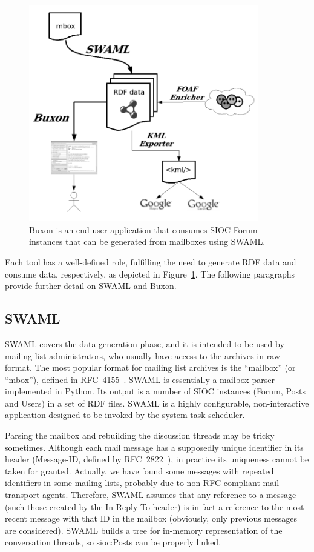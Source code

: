 \documentclass{llncs}
\begin{document}
\begin{figure}[ht]
 \centering
 \includegraphics[width=10cm]{images/swaml.png}
 \caption{\label{fig:swaml-and-buxon}Buxon is an end-user application
that consumes SIOC
\textsf{Forum} instances that can be generated from mailboxes
using SWAML.}
\end{figure}

Each tool has a well-defined role, fulfilling the need to
generate RDF data and consume data, respectively, as depicted
in Figure~\ref{fig:swaml-and-buxon}. The following paragraphs
provide further detail on SWAML and Buxon.

\subsection{SWAML}

SWAML covers the data-generation phase, and it is intended to be
used by mailing list administrators, who usually have access to
the archives in raw format. The most popular format for
mailing list archives is the ``mailbox'' (or ``mbox''), defined
in RFC~4155~\cite{RFC4155}. SWAML is essentially a mailbox parser
implemented in Python. Its output is a number of SIOC instances
(\textsf{Forum}, \textsf{Post}s and \textsf{User}s) in a set
of RDF files. SWAML is a highly configurable, non-interactive
application designed to be invoked by the system task scheduler.

Parsing the mailbox and rebuilding the discussion threads may be
tricky sometimes. Although each mail message has a supposedly unique
identifier in its header (\textsf{Message-ID}, defined by
RFC~2822~\cite{RFC2822}), in practice its uniqueness cannot be
taken for granted. Actually, we have found some
messages with repeated identifiers in some mailing lists,
probably due to non-RFC compliant mail transport agents.
Therefore, SWAML assumes that any reference to a message
(such those created by the \textsf{In-Reply-To} header)
is in fact a reference to the most recent message with that ID
in the mailbox (obviously, only previous messages are
considered). SWAML builds a tree for in-memory representation
of the conversation threads, so \textsf{sioc:Post}s can be
properly linked.
\end{document}
